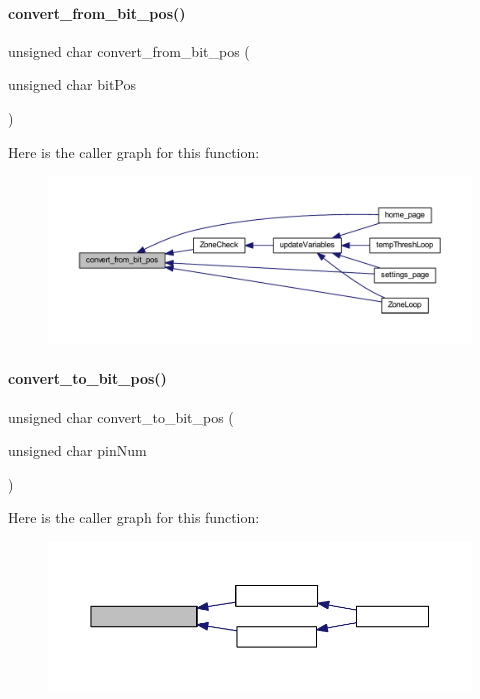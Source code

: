 \paragraph{convert\+\_\+from\+\_\+bit\+\_\+pos()}
{\footnotesize\ttfamily unsigned char convert\+\_\+from\+\_\+bit\+\_\+pos (\begin{DoxyParamCaption}\item[{unsigned char}]{bit\+Pos }\end{DoxyParamCaption})}

Here is the caller graph for this function\+:
\nopagebreak
\begin{figure}[H]
\begin{center}
\leavevmode
\includegraphics[width=350pt]{a00023_a0975bad4a272465d34f2dd42b61929f9_icgraph}
\end{center}
\end{figure}
\mbox{\label{a00023_ac22561642e81efb7df183503c322c2b0}} 
\paragraph{convert\+\_\+to\+\_\+bit\+\_\+pos()}
{\footnotesize\ttfamily unsigned char convert\+\_\+to\+\_\+bit\+\_\+pos (\begin{DoxyParamCaption}\item[{unsigned char}]{pin\+Num }\end{DoxyParamCaption})}

Here is the caller graph for this function\+:
\nopagebreak
\begin{figure}[H]
\begin{center}
\leavevmode
\includegraphics[width=350pt]{a00023_ac22561642e81efb7df183503c322c2b0_icgraph}
\end{center}
\end{figure}
\mbox{\label{a00023_abbe3f18b8a8d4112e5d5f3d1764ccabf}} 
